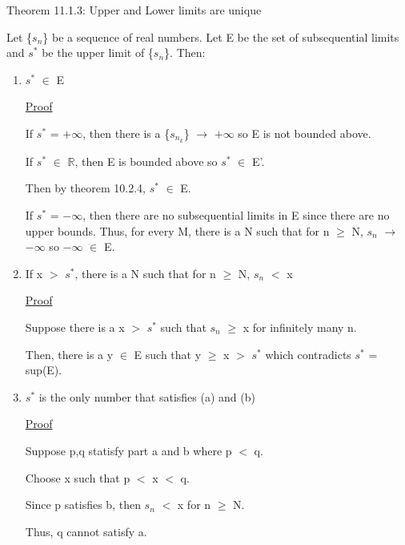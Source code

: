{ \color{red} Theorem 11.1.3: Upper and Lower limits are unique }

	\begin{adjustbox}{minipage=14cm, right, vspace=0.1cm 0.1cm}
		Let \{$s_n$\} be a sequence of real numbers.
		Let E be the set of subsequential limits and
		$s^*$ be the upper limit of \{$s_n$\}. Then:
	\end{adjustbox}

	\begin{enumerate}[label=(\alph*), leftmargin=2cm, itemsep=0.1cm]
		\item $s^*$ $\in$ E
		
			{ \color{magenta} \underline{Proof} }

				If $s^*$ = $+\infty$, then there is a
				\{$s_{n_k}$\} $\rightarrow$ $+\infty$ so E is not bounded above.
				
				If $s^*$ $\in$ $\mathbb{R}$, then E is bounded above so
				$s^*$ $\in$ E'.

				Then by {\color{red} theorem 10.2.4}, $s^*$ $\in$ E.

				If $s^*$ = $-\infty$, then there are no subsequential limits
				in E since there are no upper bounds.
				Thus, for every M, there is a N such that for n $\geq$ N,
				$s_n$ $\rightarrow$ $-\infty$ so $-\infty$ $\in$ E. 

		\item If x $>$ $s^*$, there is a N such that for n $\geq$ N, $s_n$ $<$ x
		
			{ \color{magenta} \underline{Proof} }

				Suppose there is a x $>$ $s^*$ such that $s_n$ $\geq$ x
				for infinitely many n.

				Then, there is a y $\in$ E such that y $\geq$ x $>$ $s^*$
				which contradicts $s^*$ = sup(E).

		\item $s^*$ is the only number that satisfies (a) and (b)
		
			{ \color{magenta} \underline{Proof} }

				Suppose p,q statisfy part a and b where p $<$ q.

				Choose x such that p $<$ x $<$ q.

				Since p satisfies b, then $s_n$ $<$ x for n $\geq$ N.

				Thus, q cannot satisfy a.

	\end{enumerate}


































